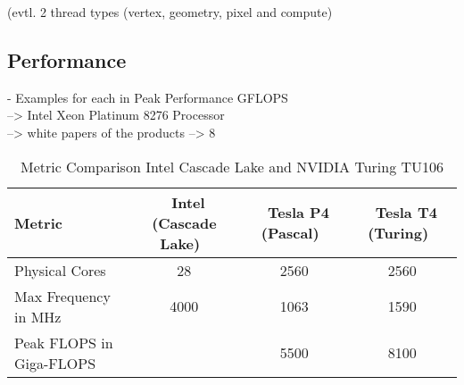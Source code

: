 \documentclass[a4paper,12pt]{llncs}
\numberwithin{equation}{section}
\begin{document}
(evtl. 2 thread types (vertex, geometry, pixel and compute)

         
\subsection{Performance}
  - Examples for each in Peak Performance GFLOPS\\
    --> Intel Xeon Platinum 8276 Processor \\
    --> white papers of the products --> 8
\begin{table}[htbp]
  \centering
  \caption{Metric Comparison Intel Cascade Lake and NVIDIA Turing TU106}
  \label{tab:comp}
  \begin{tabular}{|l|c|c|c|}
    \hline
	\textbf{Metric} & \textbf{~Intel (Cascade Lake)~} & \textbf{~Tesla P4 (Pascal)~} & \textbf{~Tesla T4 (Turing)~} \\\hline
	Physical Cores & 28 & 2560 & 2560 \\\hline
	Max Frequency in MHz & 4000 & 1063 & 1590 \\\hline
	Peak FLOPS in Giga-FLOPS & & 5500 & 8100 \\\hline
  \end{tabular}
\end{table}

\end{document}
